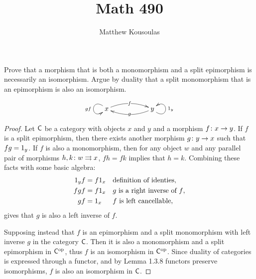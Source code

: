 \documentclass{article}
\title{Math 490}
\author{Matthew Kousoulas}
\begin{document}
\maketitle

\begin{exercise}
	Prove that a morphism that is both a monomorphism and a split epimorphism is
	necessarily an isomorphism. Argue by duality that a split monomorphism that
	is an epimorphism is also an isomorphism.
\end{exercise}
	\[\xymatrix{x \ar@(ul,dl)[]_{gf} \ar@/^8pt/[rr]|f && y \ar@/^8pt/[ll]|{g} \ar@(dr,ur)_{1_y}}\]
\begin{proof}
	Let \(\mathsf{C}\) be a category with objects \(x\) and \(y\) and a morphism
	\({f}\colon{x}\to{y}\). If \(f\) is a split epimorphism, then there exists
	another morphism \({g}\colon{y}\to{x}\) such that \(fg=1_y\). If \(f\) is also
	a monomorphism, then for any object \(w\) and any parallel pair of morphisms
	\({{h,k}\colon{w}\rightrightarrows{x}}\), \(fh=fk\) implies that \(h=k\). Combining these facts
	with some basic algebra:
	\begin{align*}
		1_yf&=f1_x && \textrm{definition of identies}, \\
		fgf&=f1_x && \textrm{\(g\) is a right inverse of \(f\)}, \\
		gf&=1_x && \textrm{\(f\) is left cancellable},
	\end{align*}
	gives that \(g\) is also a left inverse of \(f\).

	Supposing instead that \(f\) is an epimorphism and a split monomorphism with
	left inverse \(g\) in the category \(\mathsf{C}\). Then it is also a monomorphism
	and a split epimorphism in \(\mathsf{C}^{\textrm{op}}\), thus \(f\) is an isomorphism in
	\(\mathsf{C}^{\textrm{op}}\). Since duality of categories is expressed through a functor, and
	by Lemma 1.3.8 functors preserve isomorphisms, \(f\) is also an isomorphism
	in \(\mathsf{C}\).
\end{proof}
\end{document}
